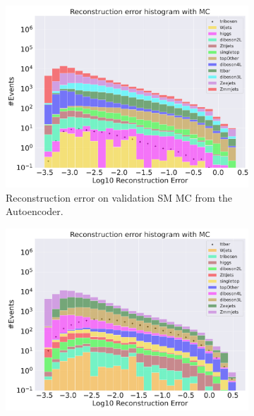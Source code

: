 \begin{figure}[h!]
    \centering
    \begin{subfigure}{.8\textwidth}
        \includegraphics[width=\textwidth]{Figures/AE_testing/big/b_data_recon_big_rm3_feats_sig_triboson.pdf}
        \caption{Reconstruction error on validation SM MC from the Autoencoder. }
        \label{fig:ae_big_triboson}
    \end{subfigure}
    \hfill
    \begin{subfigure}{.8\textwidth}
        \includegraphics[width=\textwidth]{Figures/AE_testing/big/b_data_recon_big_rm3_feats_sig_ttbar.pdf}
        \caption{}
        \label{fig:ae_big_ttbar}
    \end{subfigure}
    \hfill        
    \caption{ }
    \label{fig:ae_big_channel4}
\end{figure}

